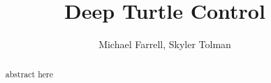 \documentclass[letterpaper, 10 pt, conference]{ieeeconf}  %
\title{\LARGE \bf
Deep Turtle Control
}
\author{Michael Farrell, Skyler Tolman}
\begin{document}
\maketitle
\thispagestyle{empty}
\pagestyle{empty}

\begin{abstract}
    abstract here
\end{abstract}















\end{document}
